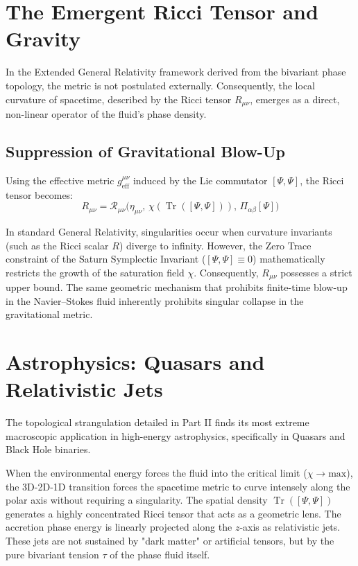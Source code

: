
\section{The Emergent Ricci Tensor and Gravity}
\label{part-3:sec:ricci}

In the Extended General Relativity framework derived from the bivariant phase topology, the metric is not postulated externally. Consequently, the local curvature of spacetime, described by the Ricci tensor $R_{\mu\nu}$, emerges as a direct, non-linear operator of the fluid's phase density.

\subsection{Suppression of Gravitational Blow-Up}

Using the effective metric $g^{\mu\nu}_{\text{eff}}$ induced by the Lie commutator $[\Psi, \Psi]$, the Ricci tensor becomes:
\begin{equation}
R_{\mu\nu} = \mathcal{R}_{\mu\nu}\Big( \eta_{\mu\nu},\, \chi(\operatorname{Tr}([\Psi, \Psi])),\, \Pi_{\alpha\beta}[\Psi] \Big)
\end{equation}

In standard General Relativity, singularities occur when curvature invariants (such as the Ricci scalar $R$) diverge to infinity. However, the Zero Trace constraint of the Saturn Symplectic Invariant ($[\Psi, \Psi] \equiv 0$) mathematically restricts the growth of the saturation field $\chi$. Consequently, $R_{\mu\nu}$ possesses a strict upper bound. The same geometric mechanism that prohibits finite-time blow-up in the Navier--Stokes fluid inherently prohibits singular collapse in the gravitational metric.

\section{Astrophysics: Quasars and Relativistic Jets}
\label{part-3:sec:quasars}

The topological strangulation detailed in Part II finds its most extreme macroscopic application in high-energy astrophysics, specifically in Quasars and Black Hole binaries.

When the environmental energy forces the fluid into the critical limit ($\chi \to \text{max}$), the 3D-2D-1D transition forces the spacetime metric to curve intensely along the polar axis without requiring a singularity. The spatial density $\operatorname{Tr}([\Psi, \Psi])$ generates a highly concentrated Ricci tensor that acts as a geometric lens. The accretion phase energy is linearly projected along the $z$-axis as relativistic jets. These jets are not sustained by "dark matter" or artificial tensors, but by the pure bivariant tension $\tau$ of the phase fluid itself.

